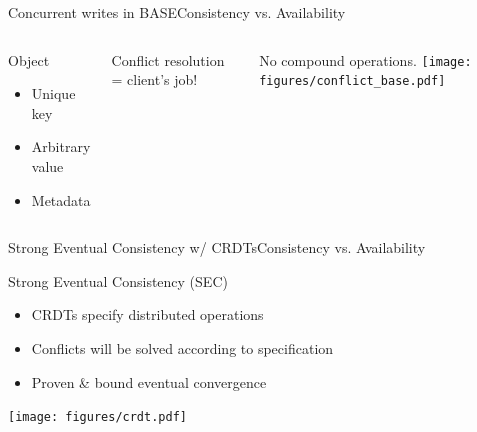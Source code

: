 \begin{frame}{Concurrent writes in BASE}{Consistency vs. Availability}

\begin{columns}
	\begin{block}{Object}
		\begin{itemize}
			\item Unique key
			\item Arbitrary value 
			\item Metadata
		\end{itemize}
	\end{block}
	\vspace{5ex} 

	Conflict resolution = client's job!
	\vspace{5ex}

	No compound operations.
	\centering
	\texttt{[image: figures/conflict\_base.pdf]}
\end{columns}







\end{frame}

\begin{frame}{Strong Eventual Consistency w/ CRDTs}{Consistency vs. Availability}

\centering\small


\vfill\raggedright\normalsize

\begin{block}{Strong Eventual Consistency (SEC)}
	\begin{itemize}
		\item CRDTs specify distributed operations
		\item Conflicts will be solved according to specification
		\item Proven \& bound eventual convergence
	\end{itemize}
\end{block}

\vfill\centering
\texttt{[image: figures/crdt.pdf]}

\end{frame}

